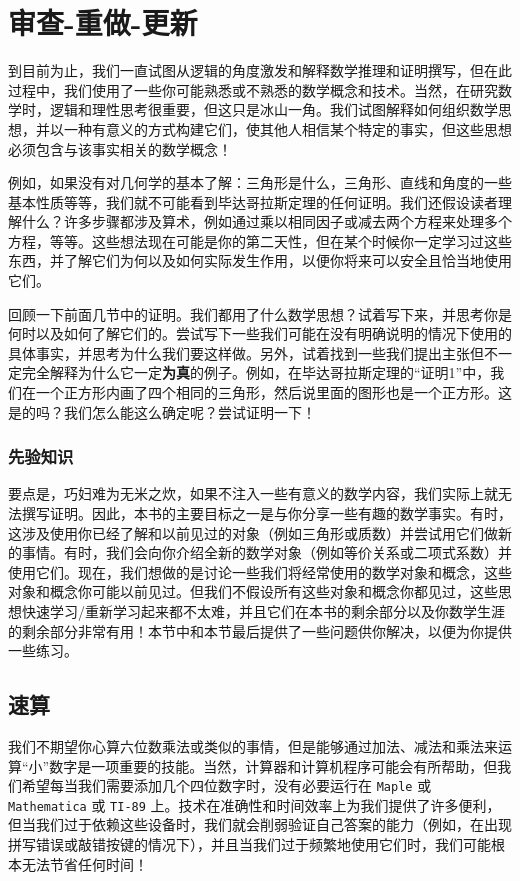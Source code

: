 \section{审查-重做-更新}\label{sec:section1.3}

到目前为止，我们一直试图从逻辑的角度激发和解释数学推理和证明撰写，但在此过程中，我们使用了一些你可能熟悉或不熟悉的数学概念和技术。当然，在研究数学时，逻辑和理性思考很重要，但这只是冰山一角。我们试图解释如何组织数学思想，并以一种有意义的方式构建它们，使其他人相信某个特定的事实，但这些思想必须包含与该事实相关的数学概念！

例如，如果没有对几何学的基本了解：三角形是什么，三角形、直线和角度的一些基本性质等等，我们就不可能看到毕达哥拉斯定理的任何证明。我们还假设读者理解什么？许多步骤都涉及算术，例如通过乘以相同因子或减去两个方程来处理多个方程，等等。这些想法现在可能是你的第二天性，但在某个时候你一定学习过这些东西，并了解它们为何以及如何实际发生作用，以便你将来可以安全且恰当地使用它们。

回顾一下前面几节中的证明。我们都用了什么数学思想？试着写下来，并思考你是何时以及如何了解它们的。尝试写下一些我们可能在没有明确说明的情况下使用的具体事实，并思考为什么我们要这样做。另外，试着找到一些我们提出主张但不一定完全解释为什么它一定\textbf{为真}的例子。例如，在毕达哥拉斯定理的“证明1”中，我们在一个正方形内画了四个相同的三角形，然后说里面的图形也是一个正方形。这是的吗？我们怎么能这么确定呢？尝试证明一下！

\subsubsection*{先验知识}

要点是，巧妇难为无米之炊，如果不注入一些有意义的数学内容，我们实际上就无法撰写证明。因此，本书的主要目标之一是与你分享一些有趣的数学事实。有时，这涉及使用你已经了解和以前见过的对象（例如三角形或质数）并尝试用它们做新的事情。有时，我们会向你介绍全新的数学对象（例如等价关系或二项式系数）并使用它们。现在，我们想做的是讨论一些我们将经常使用的数学对象和概念，这些对象和概念你可能以前见过。但我们不假设所有这些对象和概念你都见过，这些思想快速学习/重新学习起来都不太难，并且它们在本书的剩余部分以及你数学生涯的剩余部分非常有用！本节中和本节最后提供了一些问题供你解决，以便为你提供一些练习。

\subsection{速算}

我们不期望你心算六位数乘法或类似的事情，但是能够通过加法、减法和乘法来运算“小”数字是一项重要的技能。当然，计算器和计算机程序可能会有所帮助，但我们希望每当我们需要添加几个四位数字时，没有必要运行在 \verb|Maple| 或 \verb|Mathematica| 或 \verb|TI-89| 上。技术在准确性和时间效率上为我们提供了许多便利，但当我们过于依赖这些设备时，我们就会削弱验证自己答案的能力（例如，在出现拼写错误或敲错按键的情况下），并且当我们过于频繁地使用它们时，我们可能根本无法节省任何时间！

